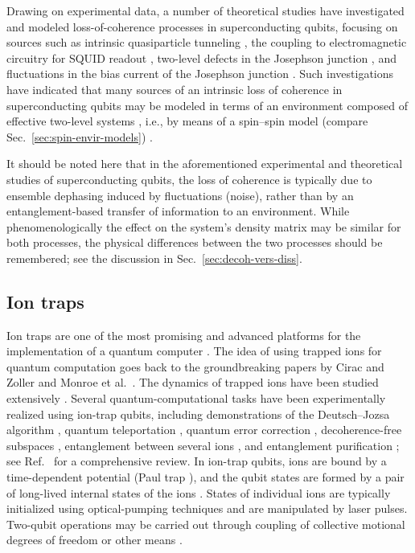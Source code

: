 \documentclass[3p,sort&compress]{elsarticle}
\begin{document}
Drawing on experimental data, a number of theoretical studies have investigated and modeled loss-of-coherence processes in superconducting qubits, focusing on sources such as intrinsic quasiparticle tunneling \cite{Catelani:2012:zz},  the coupling to electromagnetic circuitry for SQUID readout \cite{Wal:2003:pp}, two-level defects in the Josephson junction \cite{Martinis:2005:zz}, and fluctuations in the bias current of the Josephson junction \cite{Martinis:2003:bz}. Such investigations have indicated that many sources of an intrinsic loss of coherence in superconducting qubits may be modeled in terms of an environment composed of effective two-level systems  \cite{Martinis:2002:qq,Martinis:2005:zz}, i.e., by means of a spin--spin model (compare Sec.~\ref{sec:spin-envir-models}) \cite{Dube:2001:zz,Prokofev:2000:zz}. 

It should be noted here that in the aforementioned experimental and theoretical studies of superconducting qubits, the loss of coherence is typically due to ensemble dephasing induced by fluctuations (noise), rather than by an entanglement-based transfer of information to an environment. While phenomenologically the effect on the system's density matrix may be similar for both processes, the physical differences between the two processes should be remembered; see the discussion in Sec.~\ref{sec:decoh-vers-diss}. 

\subsection{\label{sec:trapped}Ion traps}

Ion traps are one of the most promising and advanced platforms for the implementation of a quantum computer \cite{Haffner:2008:pp}. The idea of using trapped ions for quantum computation goes back to the groundbreaking papers by Cirac and Zoller \cite{Cirac:1995:tt} and Monroe et al.\ \cite{Monroe:1995:oo}. The dynamics of trapped ions have been studied extensively \cite{Leibfried:2003:om}. Several quantum-computational tasks have been experimentally realized using ion-trap qubits, including demonstrations of the Deutsch--Jozsa algorithm \cite{Deutsch:1989:mm}, quantum teleportation \cite{Barrett:2004:oo,Riebe:2004:qq}, quantum error correction \cite{Chiaverini:2004:aa}, decoherence-free subspaces \cite{Kielpinski:2001:uu,Roos:204:pp,Haffner:2005:zz,Langer:2005:uu},  entanglement between several ions \cite{Haffner:2005:sc}, and entanglement purification \cite{Reichle:2006:ii}; see Ref.~\cite{Haffner:2008:pp} for a comprehensive review. In ion-trap qubits, ions are bound by a time-dependent potential (Paul trap \cite{Paul:1990:oo,Leibfried:2003:om}), and the qubit states are formed by a pair of long-lived internal states of the ions \cite{Leibfried:2003:om,Haffner:2008:pp}. States of individual ions are typically initialized using optical-pumping techniques and are manipulated by laser pulses. Two-qubit operations may be carried out through coupling of collective motional degrees of freedom \cite{Cirac:1995:tt} or other means \cite{Haffner:2008:pp}.
\end{document}
